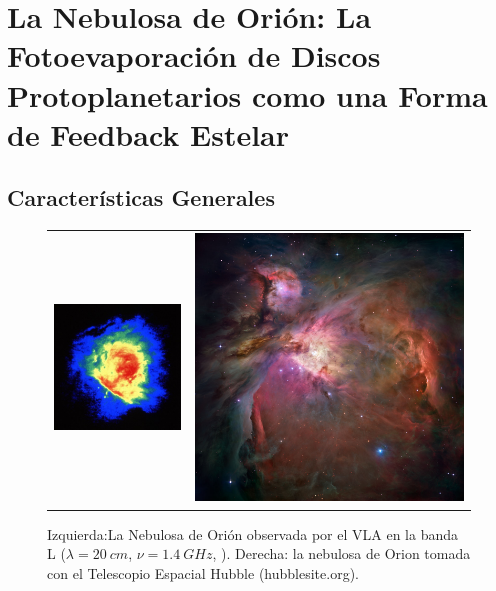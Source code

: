 \chapter[La Nebulosa de Orión]{La Nebulosa de Orión: La Fotoevaporación de Discos Protoplanetarios como una Forma de Feedback Estelar}
\thispagestyle{empty}
\label{chap:ONC}
\section{Características Generales}
\begin{figure}
  \centering
  \begin{tabular}{cc}
    \includegraphics[width=0.5\linewidth]{./Figures/OrionVR13A} & \includegraphics[width=0.5\linewidth]{./Figures/ONC-HST}
  \end{tabular}
  \caption{Izquierda:La Nebulosa de Orión observada por el VLA en la banda L ($\lambda = \SI{20}{cm}$, $\nu = \SI{1.4}{GHz}$, \citet{Yusef:1990}). Derecha: la nebulosa de Orion tomada con el Telescopio Espacial Hubble (hubblesite.org).}
\end{figure}

